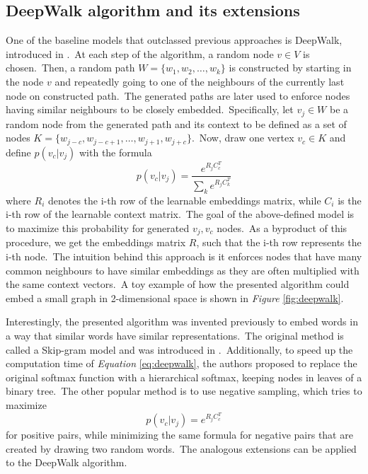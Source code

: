 \documentclass[longabstract, english, mgr]{iithesis}
\theoremstyle{default_theorem_style}\newtheorem{theorem}{Theorem}
\theoremstyle{default_theorem_style}\newtheorem{definition}{Definition}
\begin{document}
\subsection{DeepWalk algorithm and its extensions}

One of the baseline models that outclassed previous approaches is DeepWalk, introduced in \cite{deepwalk}.\ At each step
of the algorithm, a random node $v \in V$ is chosen.\ Then, a random path $W = \{w_1, w_2, \dots, w_k\}$ is
constructed by starting in the node $v$ and repeatedly going to one of the neighbours of the currently last node on
constructed path.\ The generated paths are later used to enforce nodes having similar neighbours to be closely
embedded.\ Specifically, let $v_j \in W$ be a random node from the generated path and its context to be defined as
a set of nodes $K = \{w_{j - c}, w_{j - c + 1}, \dots, w_{j + 1}, w_{j + c}\}$.\ Now, draw one vertex $v_c \in K$
and define $p(v_c | v_j)$ with the formula
\begin{equation}\label{eq:deepwalk}
p(v_c | v_j) = \frac{e^{R_j C_c^T}}{\sum_k e^{R_j C_k^T}}
\end{equation}
where $R_i$ denotes the i-th row of the learnable embeddings matrix, while $C_i$ is the i-th row of the learnable
context matrix.\ The goal of the above-defined model is to maximize this probability for generated $v_j, v_c$
nodes.\ As a byproduct of this procedure, we get the embeddings matrix $R$, such that the i-th row represents the
i-th node.\ The intuition behind this approach is it enforces nodes that have many common neighbours to have similar
embeddings as they are often multiplied with the same context vectors.\ A toy example of how the presented algorithm
could embed a small graph in 2-dimensional space is shown in \textit{Figure} \ref{fig:deepwalk}.\newline

\noindent Interestingly, the presented algorithm was invented previously to embed words in a way that similar words
have similar representations.\ The original method is called a Skip-gram model and was introduced in
\cite{skipgram}.\ Additionally, to speed up the computation time of \textit{Equation} \ref{eq:deepwalk}, the authors
proposed to replace the original softmax function with a hierarchical softmax, keeping nodes in leaves of a binary
tree.\ The other popular method is to use negative sampling, which tries to maximize
$$
p(v_c | v_j) = e^{R_j C_c^T}
$$
for positive pairs, while minimizing the same formula for negative pairs that are created by drawing two random
words.\ The analogous extensions can be applied to the DeepWalk algorithm.\newline
\end{document}

